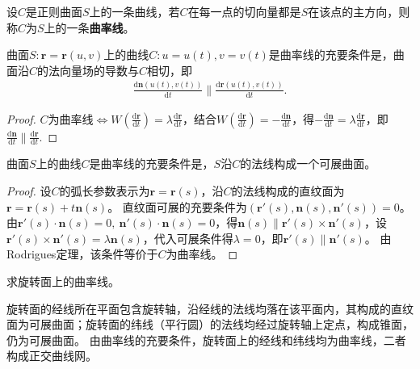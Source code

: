 \documentclass[../../main.tex]{subfiles}%
\begin{document}
\begin{definition}
设$C$是正则曲面$S$上的一条曲线，若$C$在每一点的切向量都是$S$在该点的主方向，则称$C$为$S$上的一条\textbf{曲率线}。
\end{definition}

\begin{theorem}[Rodrigues定理]
曲面$S:\boldsymbol{r}=\boldsymbol{r}(u,v)$上的曲线$C:u=u(t),v=v(t)$是曲率线的充要条件是，曲面沿$C$的法向量场的导数与$C$相切，即
\begin{align}
\frac{\mathrm{d}\boldsymbol{n}(u(t),v(t))}{\mathrm{d}t}\parallel\frac{\mathrm{d}\boldsymbol{r}(u(t),v(t))}{\mathrm{d}t}.\label{eq:rodrigues}
\end{align}
\end{theorem}
\begin{proof}

$C$为曲率线$\iff W\left(\frac{\mathrm{d}\boldsymbol{r}}{\mathrm{d}t}\right)=\lambda\frac{\mathrm{d}\boldsymbol{r}}{\mathrm{d}t}$，结合$W\left(\frac{\mathrm{d}\boldsymbol{r}}{\mathrm{d}t}\right)=-\frac{\mathrm{d}\boldsymbol{n}}{\mathrm{d}t}$，得$-\frac{\mathrm{d}\boldsymbol{n}}{\mathrm{d}t}=\lambda\frac{\mathrm{d}\boldsymbol{r}}{\mathrm{d}t}$，即$\frac{\mathrm{d}\boldsymbol{n}}{\mathrm{d}t}\parallel\frac{\mathrm{d}\boldsymbol{r}}{\mathrm{d}t}.$

\end{proof}

\begin{theorem}
曲面$S$上的曲线$C$是曲率线的充要条件是，$S$沿$C$的法线构成一个可展曲面。
\end{theorem}
\begin{proof}

设$C$的弧长参数表示为$\boldsymbol{r}=\boldsymbol{r}(s)$，沿$C$的法线构成的直纹面为$\boldsymbol{r}=\boldsymbol{r}(s)+t\boldsymbol{n}(s)$。
直纹面可展的充要条件为$(\boldsymbol{r}'(s),\boldsymbol{n}(s),\boldsymbol{n}'(s))=0$。
由$\boldsymbol{r}'(s)\cdot\boldsymbol{n}(s)=0,\ \boldsymbol{n}'(s)\cdot\boldsymbol{n}(s)=0$，得$\boldsymbol{n}(s)\parallel\boldsymbol{r}'(s)\times\boldsymbol{n}'(s)$，设$\boldsymbol{r}'(s)\times\boldsymbol{n}'(s)=\lambda\boldsymbol{n}(s)$，代入可展条件得$\lambda=0$，即$\boldsymbol{r}'(s)\parallel\boldsymbol{n}'(s)$。
由Rodrigues定理，该条件等价于$C$为曲率线。

\end{proof}

\begin{example}
求旋转面上的曲率线。
\end{example}
\begin{solution}

旋转面的经线所在平面包含旋转轴，沿经线的法线均落在该平面内，其构成的直纹面为可展曲面；旋转面的纬线（平行圆）的法线均经过旋转轴上定点，构成锥面，仍为可展曲面。
由曲率线的充要条件，旋转面上的经线和纬线均为曲率线，二者构成正交曲线网。

\end{solution}
\end{document}
